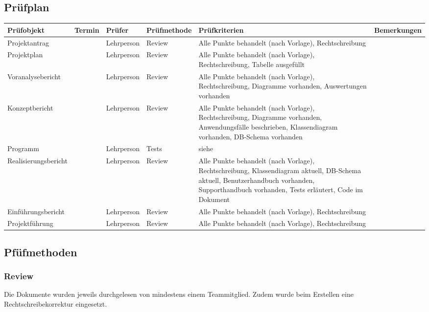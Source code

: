 \documentclass[10pt,paper=a4,final]{scrartcl}
\begin{document}
\subsection{Pr\"ufplan}
\begin{tabularx}{\textwidth}{|l|l|l|l|X|X|}
  \hline
  \bf Pr\"ufobjekt \cellcolor{blue!20!}& \bf Termin \cellcolor{blue!20!}& \bf Pr\"ufer \cellcolor{blue!20!}& \bf Pr\"ufmethode \cellcolor{blue!20!}& \bf Pr\"ufkriterien \cellcolor{blue!20!}& \bf Bemerkungen \cellcolor{blue!20!}\\ \hline
  Projektantrag		& & Lehrperson & Review & Alle Punkte behandelt (nach Vorlage), Rechtschreibung & \\ \hline
  Projektplan		& & Lehrperson & Review & Alle Punkte behandelt (nach Vorlage), Rechtschreibung, Tabelle ausgef\"ullt& \\ \hline
  Voranalysebericht	& & Lehrperson & Review & Alle Punkte behandelt (nach Vorlage), Rechtschreibung, Diagramme vorhanden, Auswertungen vorhanden & \\ \hline
  Konzeptbericht	& & Lehrperson & Review & Alle Punkte behandelt (nach Vorlage), Rechtschreibung, Diagramme vorhanden, Anwendungsf\"alle beschrieben, Klassendiagram vorhanden, DB-Schema vorhanden & \\ \hline
  Programm		& & Lehrperson & Tests & siehe \cite[4. Systemtests]{realisierung} & \\ \hline
  Realisierungsbericht	& & Lehrperson & Review & Alle Punkte behandelt (nach Vorlage), Rechtschreibung, Klassendiagram aktuell, DB-Schema aktuell, Benutzerhandbuch vorhanden, Supporthandbuch vorhanden, Tests erl\"autert, Code im Dokument & \\ \hline
  Einf\"uhrungsbericht	& & Lehrperson & Review & Alle Punkte behandelt (nach Vorlage), Rechtschreibung & \\ \hline
  Projektf\"uhrung	& & Lehrperson & Review & Alle Punkte behandelt (nach Vorlage), Rechtschreibung & \\ \hline
\end{tabularx}
\subsection{Pf\"ufmethoden}
\subsubsection{Review}
Die Dokumente wurden jeweils durchgelesen von mindestens einem Teammitglied. Zudem wurde beim Erstellen eine Rechtschreibekorrektur eingesetzt.
\end{document}

